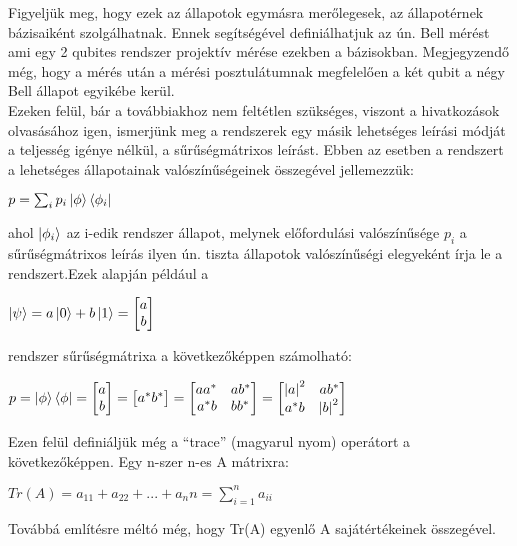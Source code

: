 Figyeljük meg, hogy ezek az állapotok egymásra merőlegesek, az állapotérnek bázisaiként szolgálhatnak. Ennek segítségével definiálhatjuk az ún. Bell mérést ami egy 2 qubites rendszer projektív mérése ezekben a bázisokban. Megjegyzendő még, hogy a mérés után a mérési posztulátumnak megfelelően a két qubit a négy Bell állapot egyikébe kerül.\\
Ezeken felül, bár a továbbiakhoz nem feltétlen szükséges, viszont a hivatkozások olvasásához igen, ismerjünk meg a rendszerek egy másik lehetséges leírási módját a teljesség igénye nélkül, a sűrűségmátrixos leírást\cite{kvantkonyv2}. Ebben az esetben a rendszert a lehetséges állapotainak valószínűségeinek összegével jellemezzük:
\begin{center}
$ p=\sum_i p_i \ket{\phi}\bra{\phi_i} $
\end{center}
ahol $ \ket{\phi_i} $ az i-edik rendszer állapot, melynek előfordulási valószínűsége $ p_i $ a sűrűségmátrixos leírás ilyen ún. tiszta állapotok valószínűségi elegyeként írja le a rendszert.Ezek alapján például a 
\begin{center}
$ \ket{\psi}=a\ket{0}+b\ket{1}= \begin{bmatrix} a\\b \end{bmatrix} $
\end{center}
rendszer sűrűségmátrixa a következőképpen számolható:
\begin{center}
$ p= \ket{\phi}\bra{\phi} = \begin{bmatrix} a \\ b \end{bmatrix} = \begin{bmatrix} a^* b^* \end{bmatrix}= \begin{bmatrix} aa^*\quad  ab^*\\a^*b \quad bb^* \end{bmatrix} = \begin{bmatrix} \abs{a}^2 \quad ab^* \\ a^*b \quad \abs{b}^2 \end{bmatrix} $
\end{center}
Ezen felül definiáljük még a “trace” (magyarul nyom) operátort a következőképpen. Egy n-szer n-es A mátrixra:
\begin{center}
$ Tr(A) = a_{11}+a_{22}+... +a_nn= \sum_{i=1}^n a_{ii} $
\end{center}
Továbbá említésre méltó még, hogy Tr(A) egyenlő A sajátértékeinek összegével.

